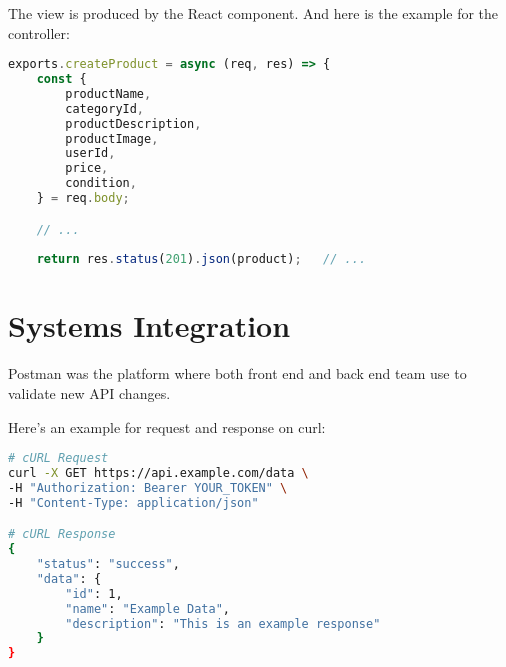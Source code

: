 The view is produced by the React component. And here is the example for the controller:

\begin{lstlisting}[language=JavaScript]
exports.createProduct = async (req, res) => {
	const {
		productName,
		categoryId,
		productDescription,
		productImage,
		userId,
		price,
		condition,
	} = req.body;

	// ...
	
	return res.status(201).json(product); 	// ...
\end{lstlisting}

\section{Systems Integration}

Postman was the platform where both front end and back end team use to validate new API changes.

Here's an example for request and response on curl:


\begin{lstlisting}[language=bash]
# cURL Request
curl -X GET https://api.example.com/data \
-H "Authorization: Bearer YOUR_TOKEN" \
-H "Content-Type: application/json"

# cURL Response
{
	"status": "success",
	"data": {
		"id": 1,
		"name": "Example Data",
		"description": "This is an example response"
	}
}
\end{lstlisting}

\clearpage